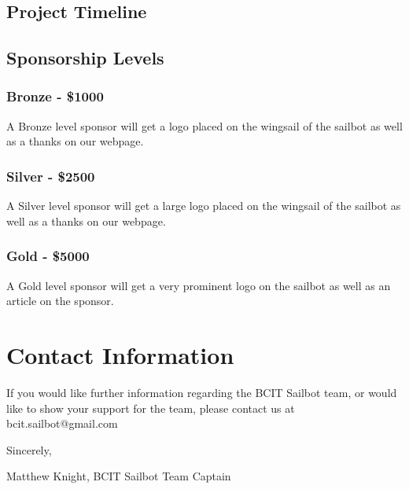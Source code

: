 \documentclass{article}
\begin{document}
\begin{center}
\end{center}

\subsection*{Project Timeline}

\begin{center}
    \begin{tikzpicture}

    \end{tikzpicture}
\end{center}

\subsection*{Sponsorship Levels}

\subsubsection*{Bronze - \$1000}

A Bronze level sponsor will get a logo placed on the wingsail of the sailbot as
well as a thanks on our webpage.

\subsubsection*{Silver - \$2500}

A Silver level sponsor will get a large logo placed on the wingsail of the
sailbot as well as a thanks on our webpage.

\subsubsection*{Gold - \$5000}

A Gold level sponsor will get a very prominent logo on the sailbot as well as
an article on the sponsor.

\section*{Contact Information}
If you would like further information regarding the BCIT Sailbot team, or
would like to show your support for the team, please contact us at
bcit.sailbot@gmail.com


Sincerely,

Matthew Knight,
BCIT Sailbot Team Captain
\end{document}
